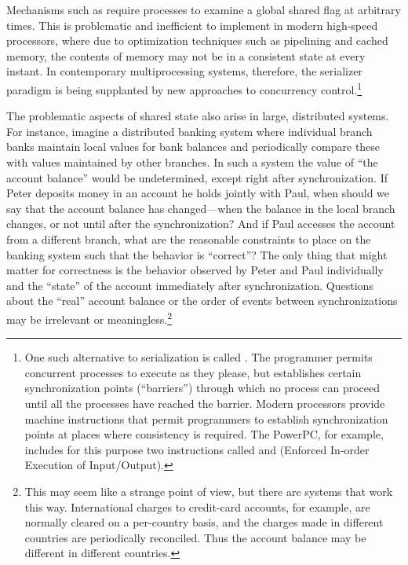 Mechanisms such as  require processes to examine a global
shared flag at arbitrary times.  This is problematic and inefficient to
implement in modern high-speed processors, where due to optimization techniques
such as pipelining and cached memory, the contents of memory may not be in a
consistent state at every instant.  In contemporary multiprocessing systems,
therefore, the serializer paradigm is being supplanted by new approaches to
concurrency control.\footnote{One such alternative to serialization is called
.  The programmer permits concurrent processes
to execute as they please, but establishes certain synchronization points
(``barriers'') through which no process can proceed until all the processes
have reached the barrier.  Modern processors provide machine instructions that
permit programmers to establish synchronization points at places where
consistency is required.  The PowerPC, for example, includes for
this purpose two instructions called  and 
(Enforced In-order Execution of Input/Output).}

The problematic aspects of shared state also arise in large, distributed
systems.  For instance, imagine a distributed banking system where individual
branch banks maintain local values for bank balances and periodically compare
these with values maintained by other branches.  In such a system the value of
``the account balance'' would be undetermined, except right after
synchronization.  If Peter deposits money in an account he holds jointly with
Paul, when should we say that the account balance has changed---when the
balance in the local branch changes, or not until after the synchronization?
And if Paul accesses the account from a different branch, what are the
reasonable constraints to place on the banking system such that the behavior is
``correct''?  The only thing that might matter for correctness is the behavior
observed by Peter and Paul individually and the ``state'' of the account
immediately after synchronization.  Questions about the ``real'' account
balance or the order of events between synchronizations may be irrelevant or
meaningless.\footnote{This may seem like a strange point of view, but there are
systems that work this way.  International charges to credit-card accounts, for
example, are normally cleared on a per-country basis, and the charges made in
different countries are periodically reconciled.  Thus the account balance may
be different in different countries.}

